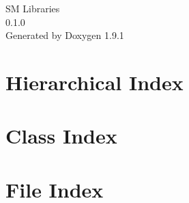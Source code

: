 \let\mypdfximage\pdfximage\def\pdfximage{\immediate\mypdfximage}\documentclass[twoside]{book}
\newcommand{\+}{\discretionary{\mbox{\scriptsize$\hookleftarrow$}}{}{}}
\newcommand{\clearemptydoublepage}{%
  \newpage{\pagestyle{empty}\cleardoublepage}%
}
\begin{document}
\raggedbottom

\hypersetup{pageanchor=false,
             bookmarksnumbered=true,
             pdfencoding=unicode
            }
\begin{titlepage}
\vspace*{7cm}
\begin{center}%
{\Large SM Libraries \\[1ex]\large 0.\+1.\+0 }\\
\vspace*{1cm}
{\large Generated by Doxygen 1.9.1}\\
\end{center}
\end{titlepage}
\clearemptydoublepage
{}
\tableofcontents
\clearemptydoublepage
{}
\hypersetup{pageanchor=true}

\chapter{Hierarchical Index}

\chapter{Class Index}

\chapter{File Index}

\end{document}
